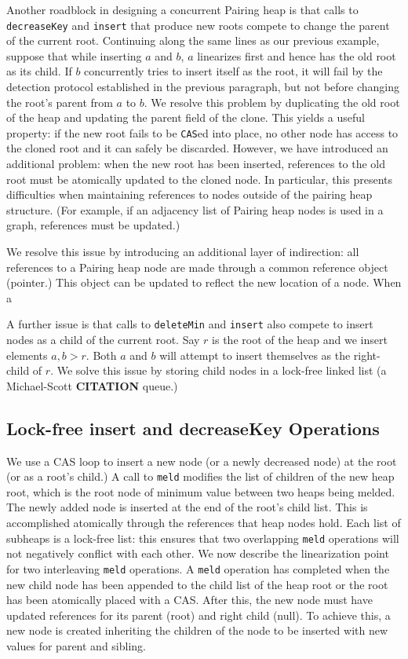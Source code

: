 \documentclass{acm_proc_article-sp}
\begin{document}
Another roadblock in designing a concurrent Pairing heap is that calls to
\texttt{decreaseKey} and \texttt{insert} that produce new roots
compete to change the parent of the current root. Continuing along the same
lines as our previous example, suppose that while inserting $a$ and $b$,
$a$ linearizes first and hence has the old root as its child. If $b$ concurrently
tries to insert itself as the root, it will fail by the detection protocol established
in the previous paragraph, but not before changing the root's parent from $a$ to $b$.
We resolve this problem by duplicating the old root of the heap and updating
the parent field of the clone. This yields a useful property:
if the new root fails to be \texttt{CAS}ed into place, no other node has
access to the cloned root and it can safely be discarded. However, we have
introduced an additional problem: when the new root has been inserted, references
to the old root must be atomically updated to the cloned node. In particular, this
presents difficulties when maintaining references
to nodes outside of the pairing heap structure. (For example, if an adjacency list
of Pairing heap nodes is used in a graph, references must be updated.)

We resolve this issue by introducing an additional layer of indirection: all references
to a Pairing heap node are made through a common reference object (pointer.)
This object can be updated to reflect the new location of a node. When a 

A further issue is that calls to \texttt{deleteMin} and \texttt{insert}
also compete to insert nodes as a child of the current root. Say $r$ is the root
of the heap and we insert elements $a,b > r$. Both $a$ and $b$ will attempt
to insert themselves as the right-child of $r$. We solve this issue by storing
child nodes in a lock-free linked list (a Michael-Scott \textbf{CITATION} queue.)

\subsection{Lock-free insert and decreaseKey Operations}

We use a CAS loop to insert a new node (or a newly decreased node)
at the root (or as a root's child.) A call to \texttt{meld} modifies the list of children of the new heap root,
which is the root node of minimum value between two heaps being melded. The newly added node is inserted at
the end of the root's child list. This is accomplished atomically through the references that heap nodes
hold. Each list of subheaps is a lock-free list: this ensures that two overlapping \texttt{meld}
operations will not negatively conflict with each other. We now describe the linearization point
for two interleaving \texttt{meld} operations. A \texttt{meld} operation has completed when the
new child node has been appended to the child list of the heap root or the root has been atomically
placed with a CAS. After this, the new node must have updated references for its parent (root) and
right child (null). To achieve this, a new node is created inheriting the children of the node to be
inserted with new values for parent and sibling. 
\end{document}
